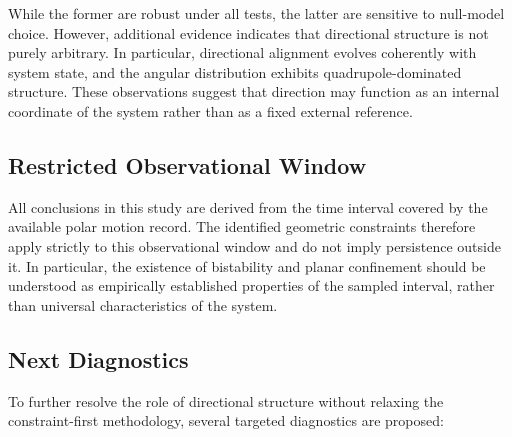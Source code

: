 \documentclass[twocolumn,9pt]{revtex4-2}
\begin{document}
While the former are robust under all tests, the latter are sensitive to null-model choice. However,
additional evidence indicates that directional structure is not purely arbitrary. In particular,
directional alignment evolves coherently with system state, and the angular distribution exhibits
quadrupole-dominated structure. These observations suggest that direction may function as an
internal coordinate of the system rather than as a fixed external reference.

\subsection{Restricted Observational Window}
\label{subsec:restricted_observational_window}

All conclusions in this study are derived from the time interval covered by the available polar
motion record. The identified geometric constraints therefore apply strictly to this observational
window and do not imply persistence outside it. In particular, the existence of bistability and
planar confinement should be understood as empirically established properties of the sampled
interval, rather than universal characteristics of the system.

\subsection{Next Diagnostics}
\label{subsec:next_diagnostics}

To further resolve the role of directional structure without relaxing the constraint-first
methodology, several targeted diagnostics are proposed:
\end{document}
